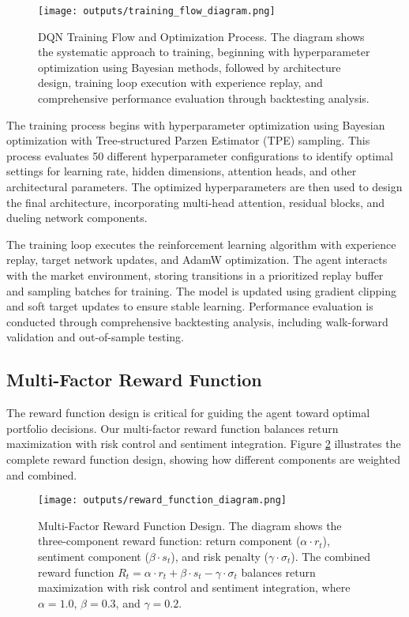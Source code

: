 \documentclass[12pt,a4paper]{article}
\begin{document}
\begin{figure}[H]
\centering
\texttt{[image: outputs/training\_flow\_diagram.png]}
\caption{DQN Training Flow and Optimization Process. The diagram shows the systematic approach to training, beginning with hyperparameter optimization using Bayesian methods, followed by architecture design, training loop execution with experience replay, and comprehensive performance evaluation through backtesting analysis.}
\label{fig:training_flow}
\end{figure}

The training process begins with hyperparameter optimization using Bayesian optimization with Tree-structured Parzen Estimator (TPE) sampling. This process evaluates 50 different hyperparameter configurations to identify optimal settings for learning rate, hidden dimensions, attention heads, and other architectural parameters. The optimized hyperparameters are then used to design the final architecture, incorporating multi-head attention, residual blocks, and dueling network components.

The training loop executes the reinforcement learning algorithm with experience replay, target network updates, and AdamW optimization. The agent interacts with the market environment, storing transitions in a prioritized replay buffer and sampling batches for training. The model is updated using gradient clipping and soft target updates to ensure stable learning. Performance evaluation is conducted through comprehensive backtesting analysis, including walk-forward validation and out-of-sample testing.

\subsection{Multi-Factor Reward Function}

The reward function design is critical for guiding the agent toward optimal portfolio decisions. Our multi-factor reward function balances return maximization with risk control and sentiment integration. Figure \ref{fig:reward_function} illustrates the complete reward function design, showing how different components are weighted and combined.

\begin{figure}[H]
\centering
\texttt{[image: outputs/reward\_function\_diagram.png]}
\caption{Multi-Factor Reward Function Design. The diagram shows the three-component reward function: return component ($\alpha \cdot r_t$), sentiment component ($\beta \cdot s_t$), and risk penalty ($\gamma \cdot \sigma_t$). The combined reward function $R_t = \alpha \cdot r_t + \beta \cdot s_t - \gamma \cdot \sigma_t$ balances return maximization with risk control and sentiment integration, where $\alpha=1.0$, $\beta=0.3$, and $\gamma=0.2$.}
\label{fig:reward_function}
\end{figure}
\end{document}
